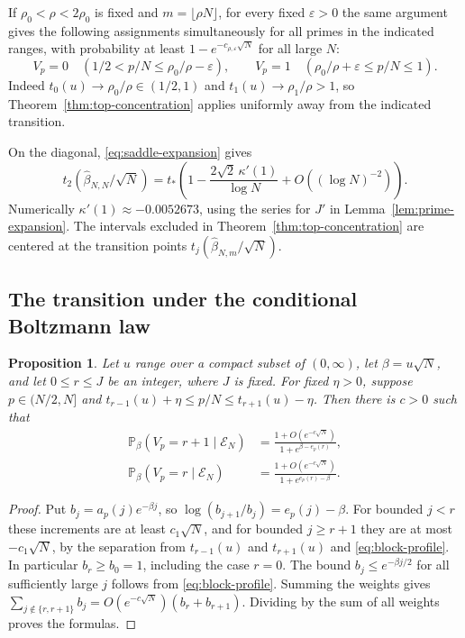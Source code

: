 \documentclass[11pt]{amsart}
\newtheorem{proposition}[theorem]{Proposition}
\theoremstyle{remark}
\newcommand{\Pp}{\mathbb P}
\begin{document}
If \(\rho_0<\rho<2\rho_0\) is fixed and \(m=\lfloor\rho N\rfloor\),
for every fixed \(\varepsilon>0\) the same argument gives the following
assignments simultaneously for all primes in the indicated ranges,
with probability at least \(1-e^{-c_{\rho,\varepsilon}\sqrt N}\) for all
large \(N\):
\[
 V_p=0\quad (1/2<p/N\le \rho_0/\rho-\varepsilon),\qquad
 V_p=1\quad (\rho_0/\rho+\varepsilon\le p/N\le1).
\]
Indeed \(t_0(u)\to\rho_0/\rho\in(1/2,1)\) and
\(t_1(u)\to\rho_1/\rho>1\), so Theorem~\ref{thm:top-concentration}
applies uniformly away from the indicated transition.

On the diagonal, \eqref{eq:saddle-expansion} gives
\[
 t_2(\widehat\beta_{N,N}/\sqrt N)
 =t_*\left(1-\frac{2\sqrt2\,\kappa'(1)}{\log N}+O((\log N)^{-2})\right).
\]
Numerically \(\kappa'(1)\approx-0.0052673\), using the series for \(J'\)
in Lemma~\ref{lem:prime-expansion}.
The intervals excluded in Theorem~\ref{thm:top-concentration} are centered
at the transition points \(t_j(\widehat\beta_{N,m}/\sqrt N)\).

\subsection{The transition under the conditional Boltzmann law}

\begin{proposition}\label{prop:logistic-block}
Let \(u\) range over a compact subset of \((0,\infty)\), let
\(\beta=u\sqrt N\), and let \(0\le r\le J\) be an integer, where
\(J\) is fixed. For fixed
\(\eta>0\), suppose \(p\in(N/2,N]\) and
\(t_{r-1}(u)+\eta\le p/N\le t_{r+1}(u)-\eta\). Then there is \(c>0\) such that
\begin{align*}
 \Pp_\beta(V_p=r+1\mid\mathcal E_N)
   &=\frac{1+O(e^{-c\sqrt N})}{1+e^{\beta-e_p(r)}},\\
 \Pp_\beta(V_p=r\mid\mathcal E_N)
   &=\frac{1+O(e^{-c\sqrt N})}{1+e^{e_p(r)-\beta}}.
\end{align*}
\end{proposition}

\begin{proof}
Put \(b_j=a_p(j)e^{-\beta j}\), so \(\log(b_{j+1}/b_j)=e_p(j)-\beta\).
For bounded \(j<r\) these increments are at least \(c_1\sqrt N\), and
for bounded \(j\ge r+1\) they are at most \(-c_1\sqrt N\), by the
separation from \(t_{r-1}(u)\) and \(t_{r+1}(u)\) and \eqref{eq:block-profile}.
In particular \(b_r\ge b_0=1\), including the case \(r=0\).
The bound \(b_j\le e^{-\beta j/2}\) for all sufficiently large \(j\)
follows from \eqref{eq:block-profile}. Summing the weights gives
\(\sum_{j\notin\{r,r+1\}}b_j=O(e^{-c\sqrt N})(b_r+b_{r+1})\).
Dividing by the sum of all weights proves the formulas.
\end{proof}
\end{document}
